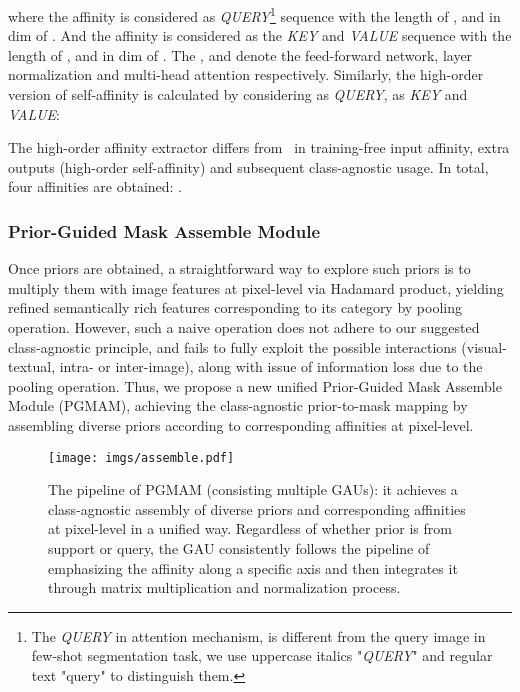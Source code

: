 \documentclass[lettersize,journal]{IEEEtran}
\begin{document}
where the affinity  is considered as \textit{QUERY}\footnote[1]{The \textit{QUERY} in attention mechanism, is different from the query image in few-shot segmentation task, we use uppercase italics "\textit{QUERY}" and regular text "query" to distinguish them.} sequence with the length of , and in dim of . And the affinity  is considered as the \textit{KEY} and \textit{VALUE} sequence with the length of , and in dim of . The ,  and  denote the feed-forward network, layer normalization and multi-head attention respectively. Similarly, the high-order version of self-affinity  is calculated by considering  as \textit{QUERY},  as \textit{KEY} and \textit{VALUE}:

The high-order affinity extractor differs from~\cite{ZhangWWG22} in training-free input affinity, extra outputs (high-order self-affinity) and subsequent class-agnostic usage. In total, four affinities are obtained: . 


\subsubsection{Prior-Guided Mask Assemble Module}
\label{subsubsection:assemble}


Once priors are obtained, a straightforward way to explore such priors is to multiply them with image features at pixel-level via Hadamard product, yielding refined semantically rich features corresponding to its category by pooling operation. However, such a naive operation does not adhere to our suggested class-agnostic principle, and fails to fully exploit the possible interactions (visual-textual, intra- or inter-image), along with issue of information loss due to the pooling operation. Thus, we propose a new unified Prior-Guided Mask Assemble Module (PGMAM), achieving the class-agnostic prior-to-mask mapping by assembling diverse priors according to corresponding affinities at pixel-level. 


\begin{figure}[h]
  \centering
  \texttt{[image: imgs/assemble.pdf]}
  \caption{The pipeline of PGMAM (consisting multiple GAUs): it achieves a class-agnostic assembly of diverse priors and corresponding affinities at pixel-level in a unified way. Regardless of whether prior is from support or query, the GAU consistently follows the pipeline of emphasizing the affinity along a specific axis and then integrates it through matrix multiplication and normalization process.}
  \label{fig:assemble}
\end{figure}
\end{document}
